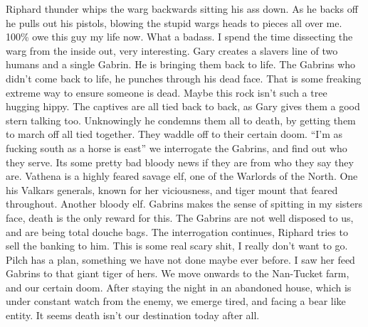 Riphard thunder whips the warg backwards sitting his ass down. As he backs off he pulls out his pistols, blowing the stupid wargs heads to pieces all over me. 100\% owe this guy my life now. What a badass. I spend the time dissecting the warg from the inside out, very interesting.\medskip
Gary creates a slavers line of two humans and a single Gabrin. He is bringing them back to life. The Gabrins who didn’t come back to life, he punches through his dead face. That is some freaking extreme way to ensure someone is dead. Maybe this rock isn’t such a tree hugging hippy. The captives are all tied back to back, as Gary gives them a good stern talking too. Unknowingly he condemns them all to death, by getting them to march off all tied together. They waddle off to their certain doom.\medskip
“I’m as fucking south as a horse is east” we interrogate the Gabrins, and find out who they serve. Its some pretty bad bloody news if they are from who they say they are.\medskip
Vathena is a highly feared savage elf, one of the Warlords of the North. One his Valkars generals, known for her viciousness, and tiger mount that feared throughout.\medskip
Another bloody elf.\medskip
Gabrins makes the sense of spitting in my sisters face, death is the only reward for this. The Gabrins are not well disposed to us, and are being total douche bags.\medskip
The interrogation continues, Riphard tries to sell the banking to him.\medskip
This is some real scary shit, I really don’t want to go. Pilch has a plan, something we have not done maybe ever before. I saw her feed Gabrins to that giant tiger of hers.\medskip
We move onwards to the Nan-Tucket farm, and our certain doom.\medskip
After staying the night in an abandoned house, which is under constant watch from the enemy, we emerge tired, and facing a bear like entity. It seems death isn’t our destination today after all.